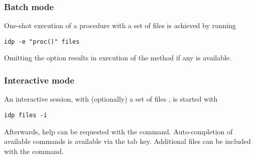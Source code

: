\subsubsection{Batch mode}
One-shot execution of a procedure  with a set of files  is achieved by running
\begin{lstlisting}
idp -e "proc()" files
\end{lstlisting}
Omitting the  option results in execution of the  method if any is available.

\subsubsection{Interactive mode}
An interactive session, with (optionally) a set of files , is started with 
\begin{lstlisting}
idp files -i
\end{lstlisting}

Afterwards, help can be requested with the  command. 
Auto-completion of available commands is available via the tab key.
Additional files can be included with the  command.
